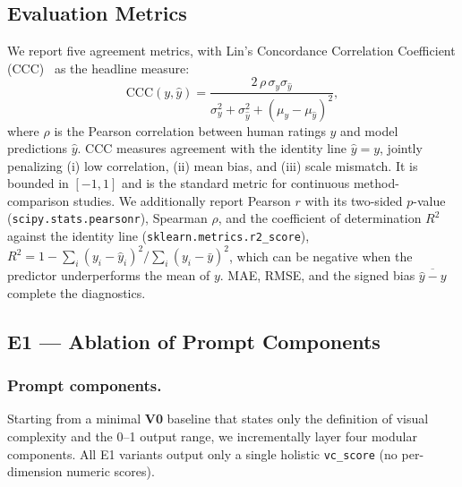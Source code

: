 \subsection{Evaluation Metrics}
\label{app:vc-metrics}

We report five agreement metrics, with Lin's Concordance Correlation
Coefficient (CCC)~\cite{lin1989ccc} as the headline measure:
\begin{equation}
\mathrm{CCC}(y, \hat{y}) =
\frac{2\,\rho\,\sigma_y\sigma_{\hat{y}}}
     {\sigma_y^2 + \sigma_{\hat{y}}^2 + (\mu_y - \mu_{\hat{y}})^2},
\end{equation}
where $\rho$ is the Pearson correlation between human ratings $y$ and model
predictions $\hat{y}$. CCC measures agreement with the identity line
$\hat{y}=y$, jointly penalizing (i) low correlation, (ii) mean bias, and
(iii) scale mismatch. It is bounded in $[-1, 1]$ and is the standard metric
for continuous method-comparison studies. We additionally report Pearson $r$
with its two-sided $p$-value (\texttt{scipy.stats.pearsonr}), Spearman $\rho$,
and the coefficient of determination $R^2$ against the identity line
(\texttt{sklearn.metrics.r2\_score}),
$R^2 = 1 - \sum_i (y_i - \hat{y}_i)^2 / \sum_i (y_i - \bar{y})^2$, which can
be negative when the predictor underperforms the mean of $y$. MAE, RMSE, and
the signed bias $\overline{\hat{y}-y}$ complete the diagnostics.

\subsection{E1 --- Ablation of Prompt Components}
\label{app:vc-e1}

\subsubsection{Prompt components.}
Starting from a minimal \textbf{V0} baseline that states only the definition
of visual complexity and the 0--1 output range, we incrementally layer four
modular components. All E1 variants output only a single holistic
\texttt{vc\_score} (no per-dimension numeric scores).

